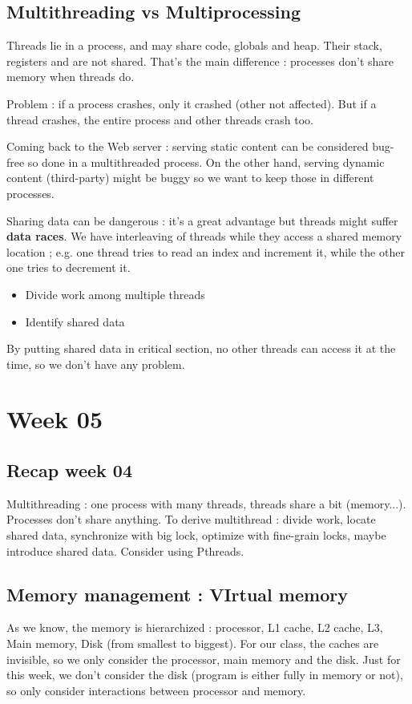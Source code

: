 \documentclass[12pt,a4paper]{article}
\begin{document}
\subsection{Multithreading vs Multiprocessing}
Threads lie in a process, and may share code, globals and heap. Their stack, registers and  are not shared. That's the main difference : processes don't share memory when threads do. 

Problem : if a process crashes, only it crashed (other not affected). But if a thread crashes, the entire process and other threads crash too. 

Coming back to the Web server : serving static content can be considered bug-free so done in a multithreaded process. On the other hand, serving dynamic content (third-party) might be buggy so we want to keep those in different processes.

Sharing data can be dangerous : it's a great advantage but threads might suffer \textbf{data races}. We have interleaving of threads while they access a shared memory location ; e.g. one thread tries to read an index and increment it, while the other one tries to decrement it. 

\begin{itemize}
    \item Divide work among multiple threads
    \item Identify shared data 
\end{itemize}

By putting shared data in critical section, no other threads can access it at the time, so we don't have any problem. 

\section{Week 05}
\subsection{Recap week 04}
Multithreading : one process with many threads, threads share a bit (memory...). Processes don't share anything. To derive multithread : divide work, locate shared data, synchronize with big lock, optimize with fine-grain locks, maybe introduce shared data. Consider using Pthreads. 

\subsection{Memory management : VIrtual memory}
As we know, the memory is hierarchized : processor, L1 cache, L2 cache, L3, Main memory, Disk (from smallest to biggest). For our class, the caches are invisible, so we only consider the processor, main memory and the disk. Just for this week, we don't consider the disk (program is either fully in memory or not), so only consider interactions between processor and memory. 
\end{document}
